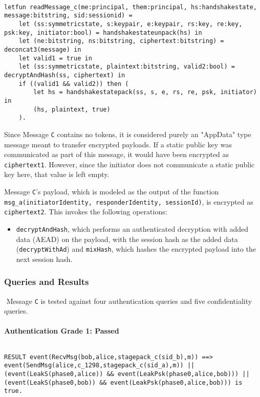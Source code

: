 \begin{lstlisting}

letfun readMessage_c(me:principal, them:principal, hs:handshakestate, message:bitstring, sid:sessionid) =
	let (ss:symmetricstate, s:keypair, e:keypair, rs:key, re:key, psk:key, initiator:bool) = handshakestateunpack(hs) in
	let (ne:bitstring, ns:bitstring, ciphertext:bitstring) = deconcat3(message) in
	let valid1 = true in
	let (ss:symmetricstate, plaintext:bitstring, valid2:bool) = decryptAndHash(ss, ciphertext) in
	if ((valid1 && valid2)) then (
		let hs = handshakestatepack(ss, s, e, rs, re, psk, initiator) in
		(hs, plaintext, true)
	).

\end{lstlisting}

Since Message \texttt{C} contains no tokens, it is considered purely an "AppData" type message meant to transfer encrypted payloads.
If a static public key was communicated as part of this message, it would have been encrypted as \texttt{ciphertext1}. However, since the initiator does not communicate a static public key here, that value is left empty.


Message \texttt{C}'s payload, which is modeled as the output of the function \texttt{msg\_a(initiatorIdentity, responderIdentity, sessionId)}, is encrypted as \texttt{ciphertext2}. This invokes the following operations:


\begin{itemize}

\item \texttt{decryptAndHash}, which performs an authenticated decryption with added data (AEAD) on the payload, with the session hash as the added data (\texttt{decryptWithAd}) and \texttt{mixHash}, which hashes the encrypted payload into the next session hash.

\end{itemize}
\subsubsection{Queries and Results}$ $
Message \texttt{C} is tested against four authentication queries and five confidentiality queries.
\paragraph{Authentication Grade 1: Passed}$ $
\begin{lstlisting}
RESULT event(RecvMsg(bob,alice,stagepack_c(sid_b),m)) ==> event(SendMsg(alice,c_1298,stagepack_c(sid_a),m)) || (event(LeakS(phase0,alice)) && event(LeakPsk(phase0,alice,bob))) || (event(LeakS(phase0,bob)) && event(LeakPsk(phase0,alice,bob))) is true.
\end{lstlisting}

